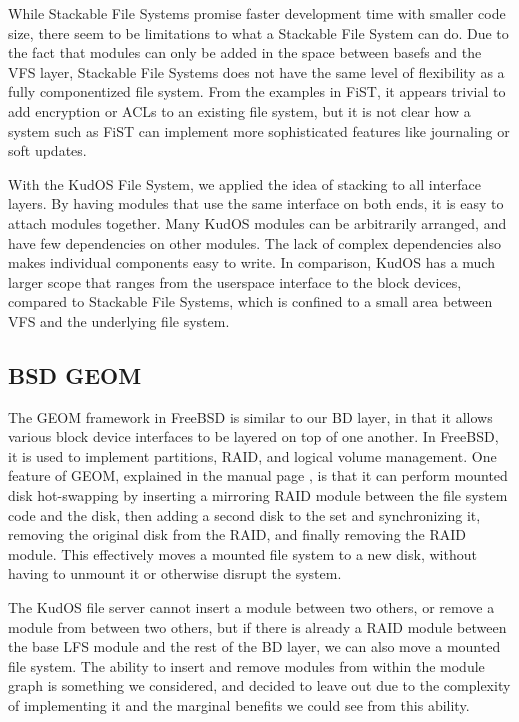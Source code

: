 While Stackable File Systems promise faster development time with smaller code
size, there seem to be limitations to what a Stackable File System can do.
Due to the fact that modules can only be added in the space between basefs and
the VFS layer, Stackable File Systems does not have the same level of
flexibility as a fully componentized file system. From the examples in FiST, it
appears trivial to add encryption or ACLs to an existing file system, but it is
not clear how a system such as FiST can implement more sophisticated features
like journaling or soft updates.

With the KudOS File System, we applied the idea of stacking to all interface
layers. By having modules that use the same interface on both ends, it is easy
to attach modules together. Many KudOS modules can be arbitrarily arranged, and
have few dependencies on other modules. The lack of complex dependencies also
makes individual components easy to write. In comparison, KudOS has a much larger
scope that ranges from the userspace interface to the block devices, compared to
Stackable File Systems, which is confined to a small area between VFS and the
underlying file system.

\subsection{BSD GEOM}
\label{sec:related:geom}

The GEOM framework in FreeBSD is similar to our BD layer, in that it allows
various block device interfaces to be layered on top of one another. In FreeBSD,
it is used to implement partitions, RAID, and logical volume management. One
feature of GEOM, explained in the manual page \cite{geom}, is that it can
perform mounted disk hot-swapping by inserting a mirroring RAID module between
the file system code and the disk, then adding a second disk to the set and
synchronizing it, removing the original disk from the RAID, and finally removing
the RAID module. This effectively moves a mounted file system to a new disk,
without having to unmount it or otherwise disrupt the system.

The KudOS file server cannot insert a module between two others, or remove a
module from between two others, but if there is already a RAID module between
the base LFS module and the rest of the BD layer, we can also move a mounted
file system. The ability to insert and remove modules from within the module
graph is something we considered, and decided to leave out due to the complexity
of implementing it and the marginal benefits we could see from this ability.

